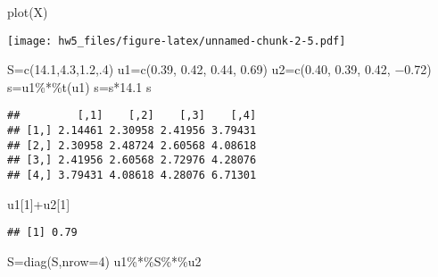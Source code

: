 \documentclass[
]{article}
\newenvironment{Shaded}{\begin{snugshade}}{\end{snugshade}}
\newcommand{\AttributeTok}[1]{\textcolor[rgb]{0.77,0.63,0.00}{#1}}
\newcommand{\DecValTok}[1]{\textcolor[rgb]{0.00,0.00,0.81}{#1}}
\newcommand{\FloatTok}[1]{\textcolor[rgb]{0.00,0.00,0.81}{#1}}
\newcommand{\FunctionTok}[1]{\textcolor[rgb]{0.00,0.00,0.00}{#1}}
\newcommand{\NormalTok}[1]{#1}
\newcommand{\OtherTok}[1]{\textcolor[rgb]{0.56,0.35,0.01}{#1}}
\newcommand{\SpecialCharTok}[1]{\textcolor[rgb]{0.00,0.00,0.00}{#1}}
\begin{document}
\begin{Shaded}
\begin{Highlighting}[]
\FunctionTok{plot}\NormalTok{(X)}
\end{Highlighting}
\end{Shaded}

\texttt{[image: hw5\_files/figure-latex/unnamed-chunk-2-5.pdf]}

\begin{Shaded}
\begin{Highlighting}[]
\NormalTok{S}\OtherTok{=}\FunctionTok{c}\NormalTok{(}\FloatTok{14.1}\NormalTok{,}\FloatTok{4.3}\NormalTok{,}\FloatTok{1.2}\NormalTok{,.}\DecValTok{4}\NormalTok{)}
\NormalTok{u1}\OtherTok{=}\FunctionTok{c}\NormalTok{(}\FloatTok{0.39}\NormalTok{, }\FloatTok{0.42}\NormalTok{, }\FloatTok{0.44}\NormalTok{, }\FloatTok{0.69}\NormalTok{)}
\NormalTok{u2}\OtherTok{=}\FunctionTok{c}\NormalTok{(}\FloatTok{0.40}\NormalTok{, }\FloatTok{0.39}\NormalTok{, }\FloatTok{0.42}\NormalTok{, −}\FloatTok{0.72}\NormalTok{)}
\NormalTok{s}\OtherTok{=}\NormalTok{u1}\SpecialCharTok{\%*\%}\FunctionTok{t}\NormalTok{(u1)}
\NormalTok{s}\OtherTok{=}\NormalTok{s}\SpecialCharTok{*}\FloatTok{14.1}
\NormalTok{s}
\end{Highlighting}
\end{Shaded}

\begin{verbatim}
##         [,1]    [,2]    [,3]    [,4]
## [1,] 2.14461 2.30958 2.41956 3.79431
## [2,] 2.30958 2.48724 2.60568 4.08618
## [3,] 2.41956 2.60568 2.72976 4.28076
## [4,] 3.79431 4.08618 4.28076 6.71301
\end{verbatim}

\begin{Shaded}
\begin{Highlighting}[]
\NormalTok{u1[}\DecValTok{1}\NormalTok{]}\SpecialCharTok{+}\NormalTok{u2[}\DecValTok{1}\NormalTok{]}
\end{Highlighting}
\end{Shaded}

\begin{verbatim}
## [1] 0.79
\end{verbatim}

\begin{Shaded}
\begin{Highlighting}[]
\NormalTok{S}\OtherTok{=}\FunctionTok{diag}\NormalTok{(S,}\AttributeTok{nrow=}\DecValTok{4}\NormalTok{)}
\NormalTok{u1}\SpecialCharTok{\%*\%}\NormalTok{S}\SpecialCharTok{\%*\%}\NormalTok{u2}
\end{Highlighting}
\end{Shaded}
\end{document}

